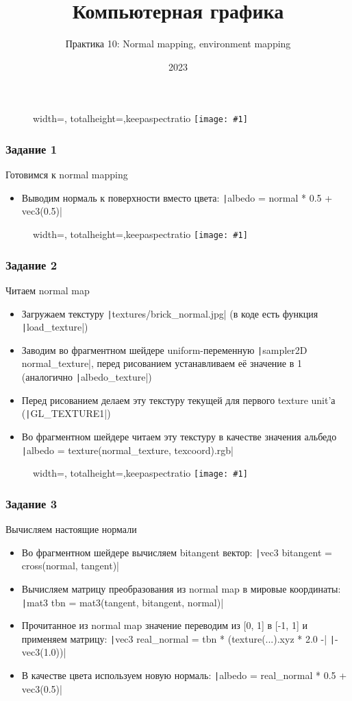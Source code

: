 \documentclass[10pt]{beamer}
\title{Компьютерная графика}
\subtitle{Практика 10: Normal mapping, environment mapping}
\date{2023}
\newcommand{\slideimage}[1]{
  \begin{figure}
    \begin{adjustbox}{width=\textwidth, totalheight=\textheight-2\baselineskip-2\baselineskip,keepaspectratio}
      \texttt{[image: \#1]}
    \end{adjustbox}
  \end{figure}
}
\begin{document}
\frame{\titlepage}

\begin{frame}[fragile]
\slideimage{0.png}
\end{frame}

\begin{frame}[fragile]
\frametitle{Задание 1}
Готовимся к normal mapping
\begin{itemize}
\item Выводим нормаль к поверхности вместо цвета: \texttt|albedo = normal * 0.5 + vec3(0.5)|
\end{itemize}
\end{frame}

\begin{frame}[fragile]
\slideimage{1.png}
\end{frame}

\begin{frame}[fragile]
\frametitle{Задание 2}
Читаем normal map
\begin{itemize}
\item Загружаем текстуру \texttt|textures/brick_normal.jpg| (в коде есть функция \texttt|load_texture|)
\item Заводим во фрагментном шейдере uniform-переменную \texttt|sampler2D normal_texture|, перед рисованием устанавливаем её значение в 1 (аналогично \texttt|albedo_texture|)
\item Перед рисованием делаем эту текстуру текущей для первого texture unit'а (\texttt|GL_TEXTURE1|)
\item Во фрагментном шейдере читаем эту текстуру в качестве значения альбедо \texttt|albedo = texture(normal_texture, texcoord).rgb|
\end{itemize}
\end{frame}

\begin{frame}[fragile]
\slideimage{2.png}
\end{frame}

\begin{frame}[fragile]
\frametitle{Задание 3}
Вычисляем настоящие нормали
\begin{itemize}
\item Во фрагментном шейдере вычисляем bitangent вектор: \texttt|vec3 bitangent = cross(normal, tangent)|
\item Вычисляем матрицу преобразования из normal map в мировые координаты: \texttt|mat3 tbn = mat3(tangent, bitangent, normal)|
\item Прочитанное из normal map значение переводим из [0, 1] в [-1, 1] и применяем матрицу: \texttt|vec3 real_normal = tbn * (texture(...).xyz * 2.0 -| \texttt|- vec3(1.0))|
\item В качестве цвета используем новую нормаль: \texttt|albedo = real_normal * 0.5 + vec3(0.5)|
\end{itemize}
\end{frame}
\end{document}
